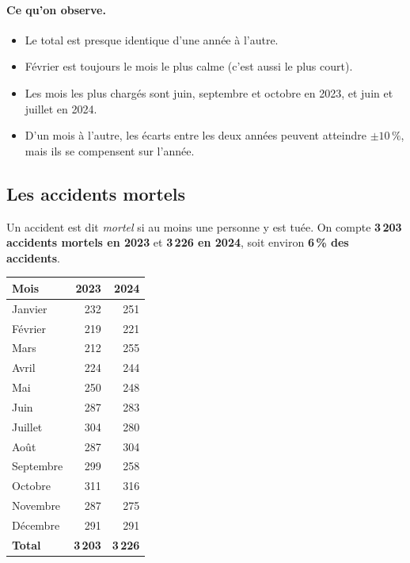 \documentclass[11pt,a4paper]{article}
\begin{document}
\paragraph{Ce qu'on observe.}
\begin{itemize}
  \item Le total est presque identique d'une année à l'autre.
  \item Février est toujours le mois le plus calme (c'est aussi le plus court).
  \item Les mois les plus chargés sont juin, septembre et octobre en 2023, et
        juin et juillet en 2024.
  \item D'un mois à l'autre, les écarts entre les deux années peuvent
        atteindre $\pm 10\,\%$, mais ils se compensent sur l'année.
\end{itemize}

\newpage
\subsection{Les accidents mortels}

Un accident est dit \emph{mortel} si au moins une personne y est tuée. On
compte \textbf{3\,203 accidents mortels en 2023} et \textbf{3\,226 en 2024},
soit environ \textbf{6\,\% des accidents}.

\begin{center}
\begin{tabular}{@{}l r r@{}}
  \toprule
  \textbf{Mois} & \textbf{2023} & \textbf{2024} \\
  \midrule
  Janvier   & 232 & 251 \\
  Février   & 219 & 221 \\
  Mars      & 212 & 255 \\
  Avril     & 224 & 244 \\
  Mai       & 250 & 248 \\
  Juin      & 287 & 283 \\
  Juillet   & 304 & 280 \\
  Août      & 287 & 304 \\
  Septembre & 299 & 258 \\
  Octobre   & 311 & 316 \\
  Novembre  & 287 & 275 \\
  Décembre  & 291 & 291 \\
  \midrule
  \textbf{Total} & \textbf{3\,203} & \textbf{3\,226} \\
  \bottomrule
\end{tabular}
\end{center}
\end{document}
